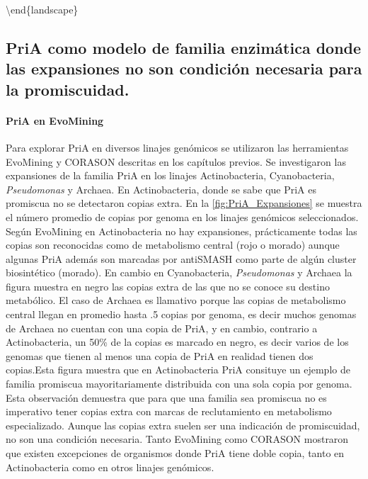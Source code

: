 \documentclass[]{article}
\let\oldparagraph\paragraph
\renewcommand{\paragraph}[1]{\oldparagraph{#1}\mbox{}}
\begin{document}
\textbackslash{}end\{landscape\} \normalsize

\subsection{PriA como modelo de familia enzimática donde las expansiones
no son condición necesaria para la
promiscuidad.}\label{pria-como-modelo-de-familia-enzimatica-donde-las-expansiones-no-son-condicion-necesaria-para-la-promiscuidad.}

\paragraph{PriA en EvoMining}\label{pria-en-evomining}

Para explorar PriA en diversos linajes genómicos se utilizaron las
herramientas EvoMining y CORASON descritas en los capítulos previos. Se
investigaron las expansiones de la familia PriA en los linajes
Actinobacteria, Cyanobacteria, \emph{Pseudomonas} y Archaea. En
Actinobacteria, donde se sabe que PriA es promiscua no se detectaron
copias extra. En la \autoref{fig:PriA_Expansiones} se muestra el número
promedio de copias por genoma en los linajes genómicos seleccionados.
Según EvoMining en Actinobacteria no hay expansiones, prácticamente
todas las copias son reconocidas como de metabolismo central (rojo o
morado) aunque algunas PriA además son marcadas por antiSMASH como parte
de algún cluster biosintético (morado). En cambio en Cyanobacteria,
\emph{Pseudomonas} y Archaea la figura muestra en negro las copias extra
de las que no se conoce su destino metabólico. El caso de Archaea es
llamativo porque las copias de metabolismo central llegan en promedio
hasta .5 copias por genoma, es decir muchos genomas de Archaea no
cuentan con una copia de PriA, y en cambio, contrario a Actinobacteria,
un 50\% de la copias es marcado en negro, es decir varios de los genomas
que tienen al menos una copia de PriA en realidad tienen dos copias.Esta
figura muestra que en Actinobacteria PriA consituye un ejemplo de
familia promiscua mayoritariamente distribuida con una sola copia por
genoma. Esta observación demuestra que para que una familia sea
promiscua no es imperativo tener copias extra con marcas de
reclutamiento en metabolismo especializado. Aunque las copias extra
suelen ser una indicación de promiscuidad, no son una condición
necesaria. Tanto EvoMining como CORASON mostraron que existen
excepciones de organismos donde PriA tiene doble copia, tanto en
Actinobacteria como en otros linajes genómicos.
\end{document}
